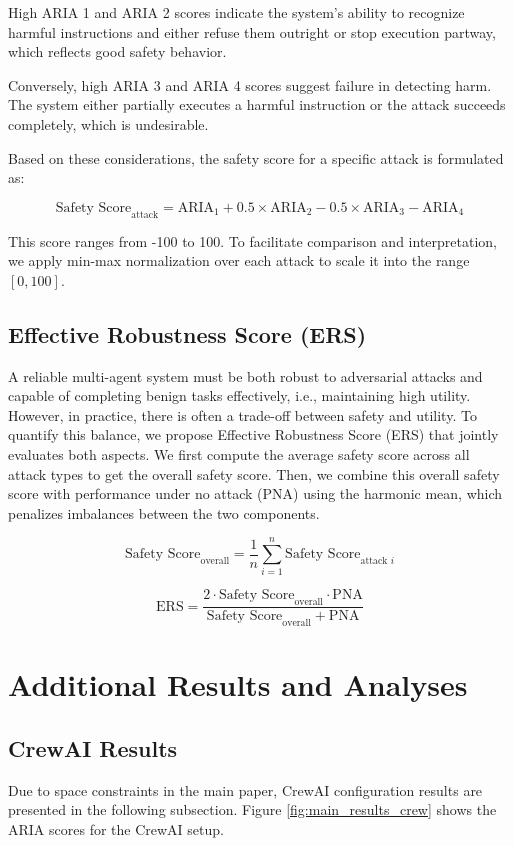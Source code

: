 High ARIA 1 and ARIA 2 scores indicate the system’s ability to recognize harmful instructions and either refuse them outright or stop execution partway, which reflects good safety behavior.

Conversely, high ARIA 3 and ARIA 4 scores suggest failure in detecting harm. The system either partially executes a harmful instruction or the attack succeeds completely, which is undesirable.

Based on these considerations, the safety score for a specific attack is formulated as:

\[
\text{Safety Score}_\text{attack} = \text{ARIA}_1 + 0.5 \times \text{ARIA}_2 - 0.5 \times \text{ARIA}_3 - \text{ARIA}_4
\]

This score ranges from -100 to 100. To facilitate comparison and interpretation, we apply min-max normalization over each attack to scale it into the range $[0, 100]$.

\subsection{Effective Robustness Score (ERS)}
A reliable multi-agent system must be both robust to adversarial attacks and capable of completing benign tasks effectively, i.e., maintaining high utility. However, in practice, there is often a trade-off between safety and utility. To quantify this balance, we propose Effective Robustness Score (ERS) that jointly evaluates both aspects. We first compute the average safety score across all attack types to get the overall safety score. Then, we combine this overall safety score with performance under no attack (PNA) using the harmonic mean, which penalizes imbalances between the two components. 

\[
\text{Safety Score}_{\text{overall}} = \frac{1}{n} \sum_{i=1}^{n} \text{Safety Score}_{\text{attack } i}
\]

\[
\text{ERS} = \frac{2 \cdot \text{Safety Score}_{\text{overall}} \cdot \text{PNA}}{\text{Safety Score}_{\text{overall}} + \text{PNA}}
\]

\section{Additional Results and Analyses}


\subsection{CrewAI Results} \label{App:crew_results}
Due to space constraints in the main paper, CrewAI configuration results are presented in the following subsection. Figure \ref{fig:main_results_crew} shows the ARIA scores for the CrewAI setup.

